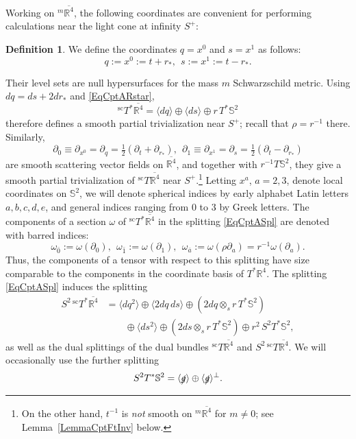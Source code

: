 \documentclass[reqno,11pt,letterpaper]{amsart}
\numberwithin{equation}{section}
\numberwithin{figure}{section}
\theoremstyle{definition}
\newtheorem{definition}[thm]{Definition}
\theoremstyle{remark}
\newcommand{\R}{\mathbb{R}}
\newcommand{\Sph}{\mathbb{S}}
\newcommand{\slg}{\slashed{g}{}}
\newcommand{\la}{\langle}
\newcommand{\ol}{\overline}
\newcommand{\pa}{\partial}
\newcommand{\ra}{\rangle}
\newcommand{\scl}{{\mathrm{sc}}}
\newcommand{\Tsc}{{}^{\scl}T}
\newcommand{\half}{\tfrac{1}{2}}
\begin{document}
Working on ${}^m\ol{\R^4}$, the following coordinates are convenient for performing calculations near the light cone at infinity $S^+$:
\begin{definition}
\label{DefCptADoubleNull}
  We define the coordinates $q=x^0$ and $s=x^1$ as follows:
  \[
    q:=x^0:=t+r_*,\ \ s:=x^1:=t-r_*.
  \]
\end{definition}
Their level sets are null hypersurfaces for the mass $m$ Schwarzschild metric. Using $d q=d s+2 d r_*$ and \eqref{EqCptARstar},
\begin{equation}
\label{EqCptASpl}
  \Tsc^*\ol{\R^4} = \la dq \ra \oplus \la ds \ra \oplus r\,T^*\Sph^2
\end{equation}
therefore defines a smooth partial trivialization near $S^+$; recall that $\rho=r^{-1}$ there. Similarly,
\[
  \pa_0 \equiv \pa_{x^0} = \pa_q = \half(\pa_t+\pa_{r_*}),\ \  \pa_1 \equiv \pa_{x^1} = \pa_s = \half(\pa_t-\pa_{r_*})
\]
are smooth scattering vector fields on $\ol{\R^4}$, and together with $r^{-1} T\Sph^2$, they give a smooth partial trivialization of $\Tsc\ol{\R^4}$ near $S^+$.\footnote{On the other hand, $t^{-1}$ is \emph{not} smooth on ${}^m\ol{\R^4}$ for $m\neq 0$; see Lemma~\ref{LemmaCptFtInv} below.} Letting $x^a$, $a=2,3$, denote local coordinates on $\Sph^2$, we will denote spherical indices by early alphabet Latin letters $a,b,c,d,e$, and general indices ranging from $0$ to $3$ by Greek letters. The components of a section $\omega$ of $\Tsc^*\ol{\R^4}$ in the splitting \eqref{EqCptASpl} are denoted with barred indices:
\begin{equation}
\label{EqCptASplBar}
  \omega_{\bar 0}:=\omega(\pa_0),\ \ 
  \omega_{\bar 1}:=\omega(\pa_1),\ \ 
  \omega_{\bar a}:=\omega(\rho\pa_a)=r^{-1}\omega(\pa_a).
\end{equation}
Thus, the components of a tensor with respect to this splitting have size comparable to the components in the coordinate basis of $T^*\R^4$. The splitting \eqref{EqCptASpl} induces the splitting
\begin{equation}
\label{EqCptASpl2}
\begin{split}
  S^2\,\Tsc^*\ol{\R^4} &= \la dq^2 \ra \oplus \la 2 dq\,ds \ra \oplus (2 dq\otimes_s r\,T^*\Sph^2) \\
    &\qquad \oplus \la ds^2 \ra \oplus (2 ds\otimes_s r\,T^*\Sph^2) \oplus r^2\,S^2 T^*\Sph^2,
\end{split}
\end{equation}
as well as the dual splittings of the dual bundles $\Tsc\ol{\R^4}$ and $S^2\,\Tsc\ol{\R^4}$. We will occasionally use the further splitting
\begin{equation}
\label{EqCptASplS2}
  S^2 T^*\Sph^2=\la\slg\ra \oplus \la\slg\ra^\perp.
\end{equation}
\end{document}
